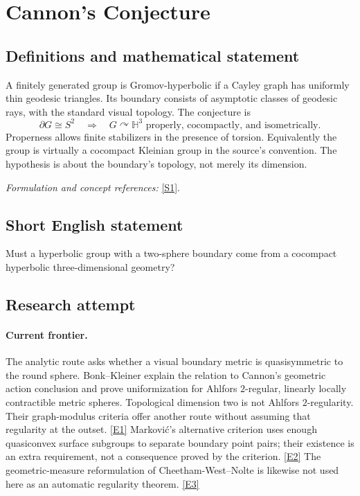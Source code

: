 \documentclass[11pt,a4paper]{article}
\newcommand{\sref}[2]{\hyperlink{source:#1:#2}{[S#2]}}
\newcommand{\eref}[2]{\hyperlink{extra:#1:#2}{[E#2]}}
\newif\ifshowcatalogue
\newcommand{\cataloguescope}[1]{\ifshowcatalogue
 \paragraph{Exact scope in the supplied catalogue.}
 \begin{quote}\small #1\end{quote}\fi}
\numberwithin{equation}{section}
\begin{document}
\setcounter{section}{0}
\clearpage
\section*{\texorpdfstring{Cannon's Conjecture}{Cannon's Conjecture}}\label{30000030}
\subsection{Definitions and mathematical statement}
A finitely generated group is Gromov-hyperbolic if a Cayley graph has uniformly thin geodesic triangles. Its boundary consists of asymptotic classes of geodesic rays, with the standard visual topology. The conjecture is
\[
 \partial G\cong S^2\quad\Longrightarrow\quad
 G\curvearrowright\mathbb H^3\text{ properly, cocompactly, and isometrically}.
\]
Properness allows finite stabilizers in the presence of torsion. Equivalently the group is virtually a cocompact Kleinian group in the source's convention. The hypothesis is about the boundary's topology, not merely its dimension.
\par\smallskip\textit{Formulation and concept references:} \sref{30000030}{1}.
\cataloguescope{Prove or disprove that every Gromov-hyperbolic group whose boundary at infinity is homeomorphic to the two-sphere acts properly discontinuously, cocompactly, and isometrically on hyperbolic three-space, equivalently is virtually a cocompact Kleinian group.}
\subsection{Short English statement}
Must a hyperbolic group with a two-sphere boundary come from a cocompact hyperbolic three-dimensional geometry?
\subsection{Research attempt}

\paragraph{Current frontier.}
The analytic route asks whether a visual boundary metric is quasisymmetric
to the round sphere. Bonk--Kleiner explain the relation to Cannon's geometric
action conclusion and prove uniformization for Ahlfors $2$-regular, linearly
locally contractible metric spheres. Topological dimension two is not
Ahlfors $2$-regularity. Their graph-modulus criteria offer another route
without assuming that regularity at the outset. \eref{30000030}{1}
Markovi\'c's alternative criterion uses enough quasiconvex surface subgroups
to separate boundary point pairs; their existence is an extra requirement,
not a consequence proved by the criterion. \eref{30000030}{2}
The geometric-measure reformulation of Cheetham-West--Nolte is likewise
not used here as an automatic regularity theorem. \eref{30000030}{3}
\end{document}
